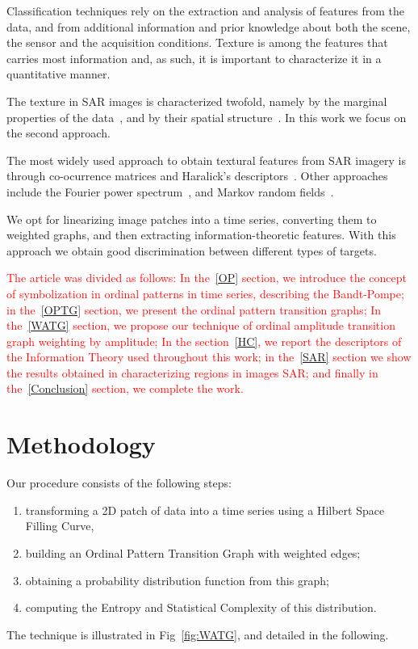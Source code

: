 \documentclass{isprs}
\begin{document}
Classification techniques rely on the extraction and analysis of features from the data, and from additional information and prior knowledge about both the scene, the sensor and the acquisition conditions.
Texture is among the features that carries most information and, as such, it is important to characterize it in a quantitative manner.

The texture in SAR images is characterized twofold, namely by the marginal properties of the data~\citep{adrian96}, and by their spatial structure~\citep{FeaturesCropDiscrimination}.
In this work we focus on the second approach.

The most widely used approach to obtain textural features from SAR imagery is through co-ocurrence matrices and Haralick's descriptors~\citep{PolSARTextureAnalysisLandCoverClassification}.
Other approaches include the Fourier power spectrum~\citep{FractalDescriptorsBasedonFourierSpectrumAppliedtoTextureAnalysis2012}, and
Markov random fields~\citep{UnsupervisedSegmentationofSyntheticApertureRadarSeaIceImageryUsingaNovelMarkovRandomFieldModel2005}.

We opt for linearizing image patches into a time series, converting them to weighted graphs, and then extracting information-theoretic features.
With this approach we obtain good discrimination between different types of targets.

\textcolor{red}{The article was divided as follows:
In the~\ref{OP} section, we introduce the concept of symbolization in ordinal patterns in time series, describing the Bandt-Pompe;
in the~\ref{OPTG} section, we present the ordinal pattern transition graphs;
In the~\ref{WATG} section, we propose our technique of ordinal amplitude transition graph weighting by amplitude;
In the section~\ref{HC}, we report the descriptors of the Information Theory used throughout this work;
in the~\ref{SAR} section we show the results obtained in characterizing regions in images SAR;
and finally in the~\ref{Conclusion} section, we complete the work.}

\section{Methodology}

Our procedure consists of the following steps:
\begin{enumerate}
	\item\label{item:Linearlize} transforming a 2D patch of data into a time series using a Hilbert Space Filling Curve,
	\item\label{item:WOPTG} building an Ordinal Pattern Transition Graph with weighted edges;
	\item\label{item:Probability} obtaining a probability distribution function from this graph;
	\item\label{item:Descriptors} computing the Entropy and Statistical Complexity of this distribution.
\end{enumerate}
The technique is illustrated in Fig~\ref{fig:WATG}, and detailed in the following.
\end{document}
